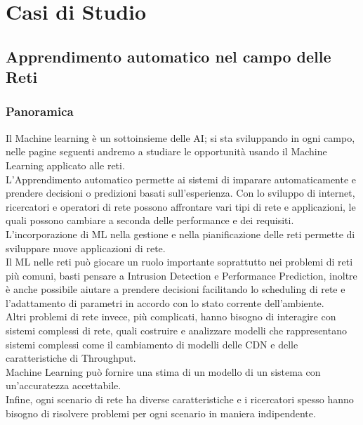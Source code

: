 \documentclass[../tesi.tex]{subfiles}
\begin{document}
\chapter{Casi di Studio}
\section{Apprendimento automatico nel campo delle Reti}



\subsection{Panoramica}

Il Machine learning è un sottoinsieme delle AI; si sta sviluppando in ogni campo, nelle pagine seguenti andremo a studiare le opportunità usando il Machine Learning applicato alle reti.\\
L'Apprendimento automatico permette ai sistemi di imparare automaticamente e prendere decisioni o predizioni basati sull’esperienza.
Con lo sviluppo di internet, ricercatori e operatori di rete possono affrontare vari tipi di rete e applicazioni, le quali possono cambiare a seconda delle performance e dei requisiti.\\
L’incorporazione di ML nella gestione e nella pianificazione delle reti permette di sviluppare nuove applicazioni di rete.\\
Il ML nelle reti può giocare un ruolo importante soprattutto nei problemi di reti più comuni, basti pensare a Intrusion Detection e Performance Prediction, inoltre è anche possibile aiutare a prendere decisioni facilitando lo scheduling di rete e l’adattamento di parametri in accordo con lo stato corrente dell’ambiente.\\
Altri problemi di rete invece, più complicati, hanno bisogno di interagire con sistemi complessi di rete, quali costruire e analizzare modelli che rappresentano sistemi complessi come il cambiamento di modelli delle \Gls{CDN} e delle caratteristiche di \Gls{Throughput}.\\
Machine Learning può fornire una stima di un modello di un sistema con un’accuratezza accettabile.\\
Infine, ogni scenario di rete ha diverse caratteristiche e i ricercatori spesso hanno bisogno di risolvere problemi per ogni scenario in maniera indipendente.
\end{document}
